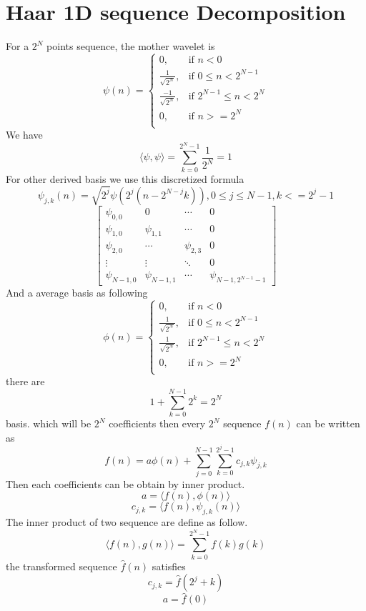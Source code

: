 \documentclass{article}
\theoremstyle{definition} %
\begin{document}
\section{Haar 1D sequence Decomposition}
For a \(2^{N}\) points sequence, the mother
wavelet is
\[
    \psi(n) =
    \begin{cases}
        0,                     & \text{if } n < 0               \\
        \frac{1}{\sqrt{2^N}},  & \text{if } 0\leq n < 2^{N-1}   \\
        \frac{-1}{\sqrt{2^N}}, & \text{if } 2^{N-1}\leq n<2^{N} \\
        0,                     & \text{if } n >= 2^N            \\
    \end{cases}
\]
We have
\[
    \langle\psi,\psi\rangle=\sum_{k=0}^{2^N-1}\frac{1}{2^N}=1
\]
For other derived basis we use
this discretized formula
\[
    \psi_{j,k}(n)=\sqrt{2^j}\psi(2^j(n-2^{N-j}k)) , 0\leq j\leq N-1
    , k<=2^j-1
\]
\[
    \left[
        \begin{array}{cccc}
            \psi_{0,0}   & 0            & \cdots     & 0                    \\
            \psi_{1,0}   & \psi_{1,1}   & \cdots     & 0                    \\
            \psi_{2,0}   & \cdots       & \psi_{2,3} & 0                    \\
            \vdots       & \vdots       & \ddots     & 0                    \\
            \psi_{N-1,0} & \psi_{N-1,1} & \cdots     & \psi_{N-1,2^{N-1}-1}
        \end{array}
        \right]
\]
And a average basis as following
\[
    \phi(n) =
    \begin{cases}
        0,                    & \text{if } n < 0               \\
        \frac{1}{\sqrt{2^N}}, & \text{if } 0\leq n < 2^{N-1}   \\
        \frac{1}{\sqrt{2^N}}, & \text{if } 2^{N-1}\leq n<2^{N} \\
        0,                    & \text{if } n >= 2^N            \\
    \end{cases}
\]
there are
\[
    1+\sum_{k=0}^{N-1}2^k=2^N
\]
basis.
which will be \(2^N\) coefficients
then every \(2^N\) sequence \(f(n)\) can be written as
\[
    f(n)=a\phi(n)+\sum_{j=0}^{N-1}\sum_{k=0}^{2^j-1}c_{j,k}\psi_{j,k}
\]
Then each coefficients can be obtain by inner product.
\[
    a=\langle f(n),\phi(n)\rangle
\]
\[
    c_{j,k}=\langle f(n),\psi_{j,k}(n)\rangle
\]
The inner product of two sequence are define as follow.
\[
    \langle f(n),g(n)\rangle=\sum_{k=0}^{2^N-1}f(k)g(k)
\]
the transformed sequence \(\hat{f}(n)\)
satisfies
\[
    c_{j,k}=\hat{f}(2^j+k)
\]
\[
    a=\hat{f}(0)
\]
\end{document}
